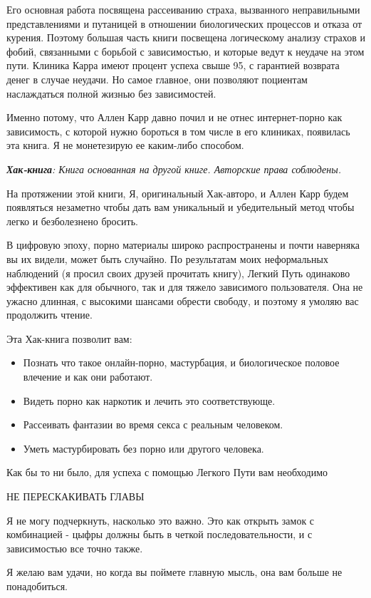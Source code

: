 \documentclass[
]{book}
\begin{document}
Его основная работа посвящена рассеиванию страха, вызванного неправильными представлениями и путаницей в отношении биологических процессов и отказа от курения. Поэтому большая часть книги посвещена логическому анализу страхов и фобий, связанными с борьбой с зависимостью, и которые ведут к неудаче на этом пути. Клиника Карра имеют процент успеха свыше 95, с гарантией возврата денег в случае неудачи. Но самое главное, они позволяют поциентам наслаждаться полной жизнью без зависимостей.

Именно потому, что Аллен Карр давно почил и не отнес интернет-порно как зависимость, с которой нужно бороться в том числе в его клиниках, появилась эта книга. Я не монетезирую ее каким-либо способом.

\emph{\textbf{Хак-книга}: Книга основанная на другой книге. Авторские права соблюдены.}

На протяжении этой книги, Я, оригинальный Хак-авторо, и Аллен Карр будем появляться незаметно чтобы дать вам уникальный и убедительный метод чтобы легко и безболезнено бросить.

В цифровую эпоху, порно материалы широко распространены и почти наверняка вы их видели, может быть случайно. По результатам моих неформальных наблюдений (я просил своих друзей прочитать книгу), Легкий Путь одинаково эффективен как для обычного, так и для тяжело зависимого пользователя. Она не ужасно длинная, с высокими шансами обрести свободу, и поэтому я умоляю вас продолжить чтение.

Эта Хак-книга позволит вам:

\begin{itemize}
\item
  Познать что такое онлайн-порно, мастурбация, и биологическое половое влечение и как они работают.
\item
  Видеть порно как наркотик и лечить это соответствующе.
\item
  Рассеивать фантазии во время секса с реальным человеком.
\item
  Уметь мастурбировать без порно или другого человека.
\end{itemize}

Как бы то ни было, для успеха с помощью Легкого Пути вам необходимо

НЕ ПЕРЕСКАКИВАТЬ ГЛАВЫ

Я не могу подчеркнуть, насколько это важно. Это как открыть замок с комбинацией - цыфры должны быть в четкой последовательности, и с зависимостью все точно также.

Я желаю вам удачи, но когда вы поймете главную мысль, она вам больше не понадобиться.
\end{document}

